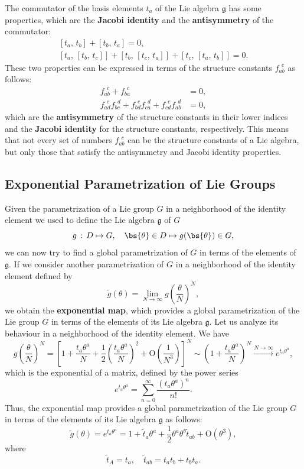 The commutator of the basis elements \(t_a\) of the Lie algebra \(\mathfrak{g}\) has some properties, which are the \textbf{Jacobi identity} and the \textbf{antisymmetry} of the commutator:
\[
    \begin{aligned}
        \left[ t_a,\,t_b \right] + \left[ t_b,\,t_a \right] = 0, \\
        \left[ t_a,\,\left[ t_b,\,t_c \right] \right] + \left[ t_b,\,\left[ t_c,\,t_a \right] \right] + \left[ t_c,\,\left[ t_a,\,t_b \right] \right] = 0.
    \end{aligned}
\]
These two properties can be expressed in terms of the structure constants \(f_{ab}^{\ \ c}\) as follows:
\[
    \begin{aligned}
        f_{ab}^{\ \ c} + f_{ba}^{\ \ c}                                                               & = 0, \\
        f_{ad}^{\ \ e} f_{bc}^{\ \ d} + f_{bd}^{\ \ e} f_{ca}^{\ \ d} + f_{cd}^{\ \ e} f_{ab}^{\ \ d} & = 0,
    \end{aligned}
\]
which are the \textbf{antisymmetry} of the structure constants in their lower indices and the \textbf{Jacobi identity} for the structure constants, respectively. This means that not every set of numbers \(f_{ab}^{\ \ c}\) can be the structure constants of a Lie algebra, but only those that satisfy the antisymmetry and Jacobi identity properties.

\subsection{Exponential Parametrization of Lie Groups}

Given the parametrization of a Lie group \(G\) in a neighborhood of the identity element we used to define the Lie algebra \(\mathfrak{g}\) of \(G\)
\[
    g \, : \, D \mapsto G, \quad \bs{\theta} \in D \mapsto g(\bs{\theta}) \in G,
\]
we can now try to find a global parametrization of \(G\) in terms of the elements of \(\mathfrak{g}\). If we consider another parametrization of \(G\) in a neighborhood of the identity element defined by
\[
    \tilde{g}(\theta) = \lim_{N \to \infty} g\left(\frac{\theta}{N}\right)^N,
\]
we obtain the \textbf{exponential map}, which provides a global parametrization of the Lie group \(G\) in terms of the elements of its Lie algebra \(\mathfrak{g}\). Let us analyze its behaviour in a neighborhood of the identity element. We have
\[
    g\left(\frac{\theta}{N}\right)^N = \left[ 1 + \frac{t_a \theta^a}{N} + \frac{1}{2} \left( \frac{t_a \theta^a}{N} \right)^2 + \mathrm{O}\left(\frac{1}{N^3}\right) \right]^N \sim \left(1 +  \frac{t_a \theta^a}{N}\right)^N \xrightarrow{N \to \infty} e^{t_a \theta^a},
\]
which is the exponential of a matrix, defined by the power series
\[
    e^{t_a \theta^a} = \sum_{n=0}^{\infty} \frac{(t_a \theta^a)^n}{n!}.
\]
Thus, the exponential map provides a global parametrization of the Lie group \(G\) in terms of the elements of its Lie algebra \(\mathfrak{g}\) as follows:
\[
    \tilde{g}(\theta) = e^{t_a \theta^a} = 1 + \tilde{t}_a \theta^a + \frac{1}{2} \theta^a \theta^b \tilde{t}_{ab}  + \mathrm{O}(\theta^3),
\]
where
\[
    \tilde{t}_A = t_a, \quad \tilde{t}_{ab} = t_a t_b + t_b t_a.
\]

